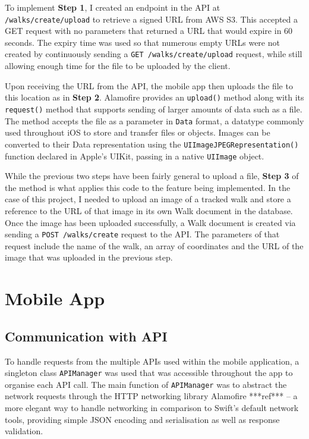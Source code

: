 To implement \textbf{Step 1}, I created an endpoint in the API at \texttt{/walks/create/upload} to retrieve a signed URL from AWS S3. This accepted a GET request with no parameters that returned a URL that would expire in 60 seconds. The expiry time was used so that numerous empty URLs were not created by continuously sending a \texttt{GET /walks/create/upload} request, while still allowing enough time for the file to be uploaded by the client.


Upon receiving the URL from the API, the mobile app then uploads the file to this location as in \textbf{Step 2}. Alamofire provides an \texttt{upload()} method along with its \texttt{request()} method that supports sending of larger amounts of data such as a file. The method accepts the file as a parameter in \texttt{Data} format, a datatype commonly used throughout iOS to store and transfer files or objects. Images can be converted to their Data representation using the \texttt{UIImageJPEGRepresentation()} function declared in Apple's UIKit, passing in a native \texttt{UIImage} object.

While the previous two steps have been fairly general to upload a file, \textbf{Step 3} of the method is what applies this code to the feature being implemented. In the case of this project, I needed to upload an image of a tracked walk and store a reference to the URL of that image in its own Walk document in the database. Once the image has been uploaded successfully, a Walk document is created via sending a \texttt{POST /walks/create} request to the API. The parameters of that request include the name of the walk, an array of coordinates and the URL of the image that was uploaded in the previous step.

\section{Mobile App}

\subsection{Communication with API}


To handle requests from the multiple APIs used within the mobile application, a singleton class \texttt{APIManager} was used that was accessible throughout the app to organise each API call. The main function of \texttt{APIManager} was to abstract the network requests through the HTTP networking library Alamofire ***ref*** -- a more elegant way to handle networking in comparison to Swift's default network tools, providing simple JSON encoding and serialisation as well as response validation.

